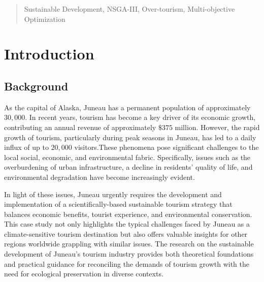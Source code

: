 \documentclass{mcmthesis}
\renewcommand{\contentsname}{\hspace*{\fill}\Large\bfseries Contents \hspace*{\fill}}
\begin{document}
\begin{abstract}
\begin{keywords}
  Sustainable Development, NSGA-III, Over-tourism, Multi-objective Optimization
\end{keywords}

\end{abstract}

\maketitle

\tableofcontents        %
\thispagestyle{empty}

\newpage

\section{Introduction}

\subsection{Background}

As the capital of Alaska, Juneau has a permanent population of approximately $30,000$. In recent years, 
tourism has become a key driver of its economic growth, contributing an annual revenue of approximately 
$\$375$ million. However, the rapid growth of tourism, particularly during peak seasons in Juneau, has led to 
a daily influx of up to $20,000$ visitors.These phenomena pose significant challenges to the local 
social, economic, and environmental fabric. Specifically, issues such as the overburdening of urban 
infrastructure, a decline in residents' quality of life, and environmental degradation have become 
increasingly evident.\par
In light of these issues, Juneau urgently requires the development and implementation of a 
scientifically-based sustainable tourism strategy that balances economic benefits, tourist 
experience, and environmental conservation. This case study not only highlights the typical 
challenges faced by Juneau as a climate-sensitive tourism destination but also offers valuable 
insights for other regions worldwide grappling with similar issues. The research on the sustainable 
development of Juneau's tourism industry provides both theoretical foundations and practical 
guidance for reconciling the demands of tourism growth with the need for ecological preservation in 
diverse contexts.
\end{document}
